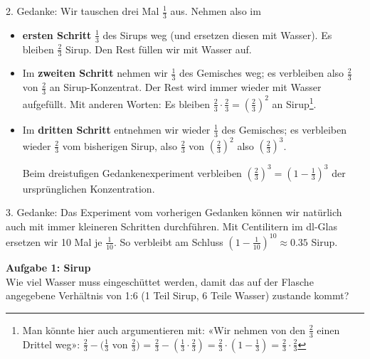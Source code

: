 2. Gedanke: Wir tauschen drei Mal $\frac13$ aus. Nehmen also im
\begin{itemize}
\item \textbf{ersten Schritt} $\frac13$ des Sirups weg (und ersetzen diesen mit Wasser).
  Es bleiben $\frac23$ Sirup. Den Rest füllen wir mit Wasser auf.
\item Im \textbf{zweiten Schritt} nehmen wir $\frac13$ des Gemisches
weg; es verbleiben also $\frac23$ von $\frac23$ an
Sirup-Konzentrat. Der Rest wird immer wieder mit Wasser aufgefüllt. Mit
anderen Worten: Es bleiben $\frac23 \cdot \frac23
= \left(\frac23\right)^2$ an Sirup\footnote{Man könnte hier auch argumentieren mit: «Wir nehmen von den $\frac23$ einen Drittel weg»: $\frac23 - (\frac13$ von $\frac23)$ = $\frac23 - (\frac13 \cdot\frac23) = \frac23 \cdot(1-\frac13)=\frac23\cdot\frac23$}.
\item Im \textbf{dritten Schritt} entnehmen wir wieder $\frac13$ des
Gemisches; es verbleiben wieder $\frac23$ vom bisherigen Sirup, also
$\frac23$ von $(\frac23)^2$ also $\left(\frac23\right)^3$.

Beim dreistufigen Gedankenexperiment verbleiben
$\left(\frac23\right)^3 = \left(1-\frac13\right)^3$ der ursprünglichen Konzentration.
\end{itemize}
\leserluft

3. Gedanke: Das Experiment vom vorherigen Gedanken können wir natürlich auch mit immer kleineren Schritten durchführen.
Mit Centilitern \zB im dl-Glas ersetzen wir 10 Mal je $\frac1{10}$. 
So verbleibt am Schluss $\left(1-\frac{1}{10}\right)^{10}\approx 0.35$ Sirup.

\newpage

\textbf{Aufgabe 1: Sirup}\\
Wie viel Wasser muss eingeschüttet werden, damit das auf der Flasche
angegebene Verhältnis von 1:6 (1 Teil Sirup, 6 Teile Wasser) zustande
kommt?


